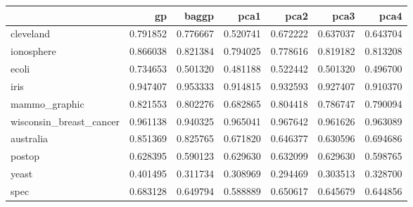 \begin{tabular}{lrrrrrr}
\toprule
{} &        gp &     baggp &      pca1 &      pca2 &      pca3 &      pca4 \\
\midrule
cleveland               &  0.791852 &  0.776667 &  0.520741 &  0.672222 &  0.637037 &  0.643704 \\
ionosphere              &  0.866038 &  0.821384 &  0.794025 &  0.778616 &  0.819182 &  0.813208 \\
ecoli                   &  0.734653 &  0.501320 &  0.481188 &  0.522442 &  0.501320 &  0.496700 \\
iris                    &  0.947407 &  0.953333 &  0.914815 &  0.932593 &  0.927407 &  0.910370 \\
mammo\_graphic           &  0.821553 &  0.802276 &  0.682865 &  0.804418 &  0.786747 &  0.790094 \\
wisconsin\_breast\_cancer &  0.961138 &  0.940325 &  0.965041 &  0.967642 &  0.961626 &  0.963089 \\
australia               &  0.851369 &  0.825765 &  0.671820 &  0.646377 &  0.630596 &  0.694686 \\
postop                  &  0.628395 &  0.590123 &  0.629630 &  0.632099 &  0.629630 &  0.598765 \\
yeast                   &  0.401495 &  0.311734 &  0.308969 &  0.294469 &  0.303513 &  0.328700 \\
spec                    &  0.683128 &  0.649794 &  0.588889 &  0.650617 &  0.645679 &  0.644856 \\
\bottomrule
\end{tabular}
